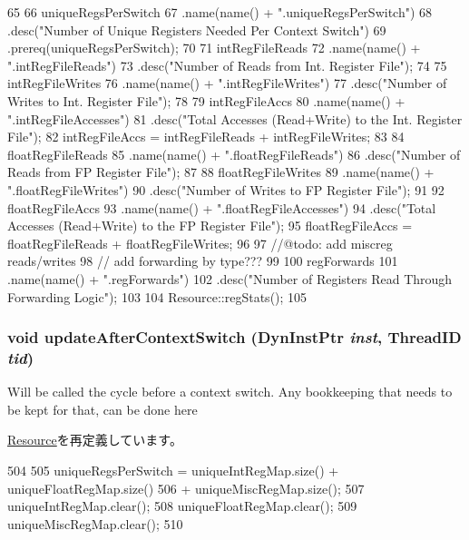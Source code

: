 \begin{DoxyCode}
65 {
66     uniqueRegsPerSwitch
67         .name(name() + ".uniqueRegsPerSwitch")
68         .desc("Number of Unique Registers Needed Per Context Switch")
69         .prereq(uniqueRegsPerSwitch);
70 
71     intRegFileReads
72         .name(name() + ".intRegFileReads")
73         .desc("Number of Reads from Int. Register File");
74 
75     intRegFileWrites
76         .name(name() + ".intRegFileWrites")
77         .desc("Number of Writes to Int. Register File");
78 
79     intRegFileAccs
80         .name(name() + ".intRegFileAccesses")
81         .desc("Total Accesses (Read+Write) to the Int. Register File");
82     intRegFileAccs = intRegFileReads + intRegFileWrites;
83 
84     floatRegFileReads
85         .name(name() + ".floatRegFileReads")
86         .desc("Number of Reads from FP Register File");
87 
88     floatRegFileWrites
89         .name(name() + ".floatRegFileWrites")
90         .desc("Number of Writes to FP Register File");
91 
92     floatRegFileAccs
93         .name(name() + ".floatRegFileAccesses")
94         .desc("Total Accesses (Read+Write) to the FP Register File");
95     floatRegFileAccs = floatRegFileReads + floatRegFileWrites;
96 
97     //@todo: add miscreg reads/writes
98     //       add forwarding by type???
99 
100     regForwards
101         .name(name() + ".regForwards")
102         .desc("Number of Registers Read Through Forwarding Logic");
103     
104     Resource::regStats();
105 }
\end{DoxyCode}
\hypertarget{classUseDefUnit_a339073618ad3c21c492d64a55ce2e216}{
\subsubsection[{updateAfterContextSwitch}]{\setlength{\rightskip}{0pt plus 5cm}void updateAfterContextSwitch ({\bf DynInstPtr} {\em inst}, \/  {\bf ThreadID} {\em tid})}}
\label{classUseDefUnit_a339073618ad3c21c492d64a55ce2e216}
Will be called the cycle before a context switch. Any bookkeeping that needs to be kept for that, can be done here 

\hyperlink{classResource_a2cf5450ce736e0c76aca0d4ef24b922a}{Resource}を再定義しています。


\begin{DoxyCode}
504 {
505     uniqueRegsPerSwitch = uniqueIntRegMap.size() + uniqueFloatRegMap.size()
506         + uniqueMiscRegMap.size();
507     uniqueIntRegMap.clear();
508     uniqueFloatRegMap.clear();
509     uniqueMiscRegMap.clear();
510 }
\end{DoxyCode}


